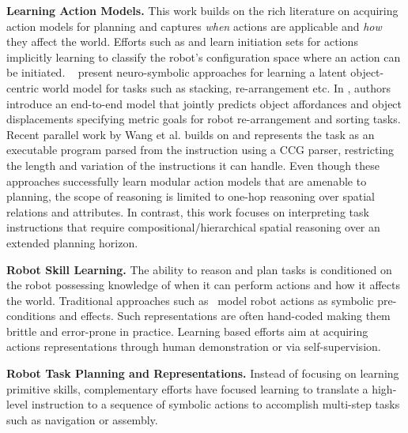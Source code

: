 \textbf{Learning Action Models.} This work builds on the rich literature on acquiring action models for planning and captures \emph{when} actions are applicable and 
\emph{how} they affect the world. 
%
Efforts such as \cite{konidaris2018skills} and \cite{wang2021learning} 
learn initiation sets for actions implicitly learning to classify
the robot's configuration space where an action can be initiated. 
%
%
~\cite{xia2018learning,silver2020few,zhu2021hierarchical} present neuro-symbolic approaches for learning a latent object-centric world model for tasks such as stacking, re-arrangement etc.  
%
In \cite{shridhar2022cliport}, authors introduce an end-to-end model that jointly predicts object affordances  and object displacements specifying metric goals for robot re-arrangement and sorting tasks. 
%
Recent parallel work by Wang et al. \cite{wang2023programmatically} builds on \cite{shridhar2022cliport} and represents the task as an executable program parsed from the instruction using a CCG parser, restricting the length and variation of the instructions it can handle. 
% 
Even though these approaches successfully learn modular action models that are amenable to planning, the scope of reasoning is limited to one-hop reasoning over spatial relations and attributes. In contrast, this work focuses on interpreting task instructions that require compositional/hierarchical spatial reasoning over an extended planning horizon. 



\iffalse

\textbf{Robot Skill Learning. }
The ability to reason and plan tasks is conditioned on the robot possessing knowledge 
of when it can perform actions and how it affects the world. 
%
Traditional approaches such as~\cite{knepper2013ikeabot} 
model robot actions as symbolic pre-conditions and effects. 
%
Such representations are often hand-coded making them 
brittle and error-prone in practice. 
%
Learning based efforts aim at acquiring actions representations through human demonstration 
or via self-supervision. 
%


\textbf{Robot Task Planning and Representations. }
Instead of focusing on learning primitive skills, complementary efforts have 
focused learning to translate a high-level instruction to a sequence of symbolic actions 
to accomplish multi-step tasks such as navigation or assembly. 

